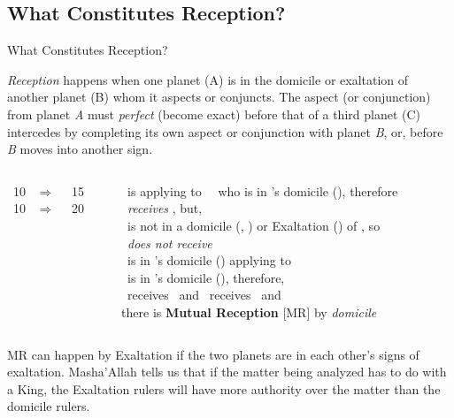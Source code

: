 \subsection{What Constitutes Reception?}
\begin{frame}[t]{What Constitutes Reception?}
\small
\begin{block}{}
\textsl{Reception} happens when one planet (A) is in the domicile or exaltation of another planet (B) whom it aspects or conjuncts. The aspect (or conjunction) from planet \textsl{A} must \textsl{perfect} (become exact)  before that of a third planet (C) intercedes by completing its own aspect or conjunction with planet \textsl{B}, or, before \textsl{B} moves into another sign.
\end{block}

\vspace{0.1cm}
\begin{columns}[T, onlytextwidth]
\Mars\ 10 \Aries\ $\Rightarrow$ \Conjunction\ \Saturn\ 15 \Aries \\
\vspace{1.5cm}
\Mars\ 10 \Capricorn\ $\Rightarrow$ \Square\ \Saturn\ 20 \Aries

\rule{.1mm}{.4\textheight}

\Mars\ is applying to \Conjunction\ \Saturn\ who is in \Mars's domicile (\Aries), therefore\\
\Mars\ \textsl{receives} \Saturn, but, \\
\Mars\ is not in a domicile (\Capricorn, \Aquarius) or Exaltation (\Libra) of \Saturn, so \\
\Saturn\ \textsl{does not receive} \Mars \\
\vspace{0.1cm}
\ul
\Mars\ is in \Saturn's domicile (\Capricorn) applying to \Square\ \Saturn \\
\Saturn\ is in \Mars's domicile (\Aries), therefore, \\
\Mars\ receives \Saturn\ and \Saturn\ receives \Mars\ and \\
there is \textbf{Mutual Reception} [MR] by \textsl{domicile}
\end{columns}
\vspace{0.2cm}
 MR can happen by Exaltation if the two planets are in each other's signs of exaltation. Masha'Allah tells us that if the matter being analyzed has to do with a King, the Exaltation rulers will have more authority over the matter than the domicile rulers.
\end{frame}